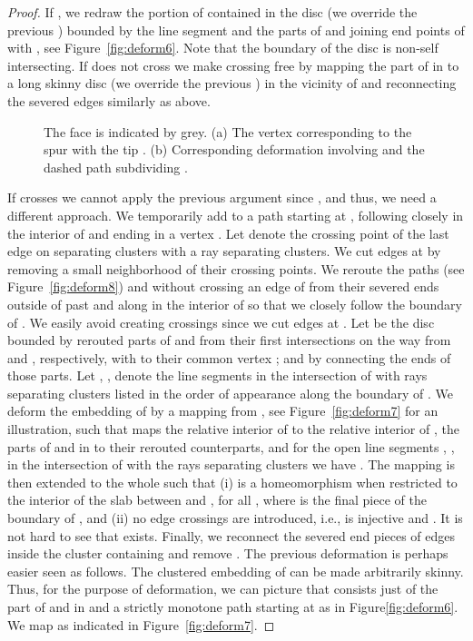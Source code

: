 \documentclass{llncs}
\begin{document}
\begin{proof}
If , we redraw the portion of  contained in the disc  (we override the previous ) bounded by the line segment 
and the parts of  and  joining end points of   with , see Figure~\ref{fig:deform6}.
Note that the boundary of the disc  is non-self intersecting.
If  does not cross  we make  crossing free by mapping
the part of  in  to a long skinny disc   (we override the previous ) in the vicinity of  and reconnecting the severed edges similarly 
as above.

 \begin{figure}
  \centering
\centering
{}
    	\hspace{1px}
\caption{The face  is indicated by grey. (a) The vertex   corresponding to the spur with the tip . (b) Corresponding  deformation involving  and the dashed path  subdividing .}
\end{figure}



If  crosses  we cannot apply the previous argument since ,
and thus, we need a different approach.
We temporarily add to  a path  starting at , following closely  in the interior of 
and ending in a vertex . Let  denote the crossing point of the last edge on 
separating clusters with a ray separating clusters. 
We cut edges at  by removing a small  neighborhood of their crossing points.
We reroute the paths   (see Figure~\ref{fig:deform8}) and  without crossing an edge of  from their severed ends outside of  past  and along  in the interior of  so that we closely follow the boundary of .
We  easily avoid creating crossings since we cut edges at .
Let   be the disc bounded by rerouted parts of  and  from their first intersections on the way from  and , respectively, with  to their common vertex ; and by  connecting the ends of those parts.
Let , , denote the line segments in the intersection of  with rays separating clusters listed in the order of appearance along the boundary of .
We deform the embedding of  by a mapping  from , see Figure~\ref{fig:deform7} for an illustration, such that  maps the relative interior of  to the relative interior of  , the parts of  and  in  to their rerouted counterparts, and for the open line segments , , in the intersection of  with the rays separating clusters we have .
The mapping  is then extended to the whole  such that (i)  is a homeomorphism when restricted to the interior
of the slab between  and , for all , where  is the 
final piece of the boundary of , and (ii) no edge crossings are introduced, i.e.,  is injective
and . It is not hard to see that  exists. Finally, we reconnect the severed end pieces of edges inside the cluster
containing  and remove .
The previous deformation is perhaps easier seen as follows. The clustered embedding of  can be made  arbitrarily skinny. Thus, for the purpose of  deformation, we can picture that  consists just of the part of  and  in  and a strictly monotone 
path starting at   as in Figure\ref{fig:deform6}. We map  as indicated in Figure~\ref{fig:deform7}.
 

\end{proof}
\end{document}

